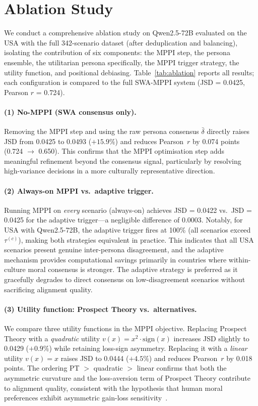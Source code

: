 \documentclass{article}
\begin{document}
\section{Ablation Study}
\label{sec:ablation}

We conduct a comprehensive ablation study on Qwen2.5-72B evaluated on the USA with
the full 342-scenario dataset (after deduplication and balancing), isolating the
contribution of six components: the MPPI step, the persona ensemble, the utilitarian
persona specifically, the MPPI trigger strategy, the utility function, and positional
debiasing. Table~\ref{tab:ablation} reports all results; each configuration is compared
to the full SWA-MPPI system (JSD = 0.0425, Pearson $r$ = 0.724).

\paragraph{(1) No-MPPI (SWA consensus only).}
Removing the MPPI step and using the raw persona consensus $\bar{\delta}$ directly
raises JSD from 0.0425 to 0.0493 ($+15.9\%$) and reduces Pearson~$r$ by 0.074 points
(0.724 $\to$ 0.650). This confirms that the MPPI optimisation step adds meaningful
refinement beyond the consensus signal, particularly by resolving high-variance decisions
in a more culturally representative direction.

\paragraph{(2) Always-on MPPI vs.\ adaptive trigger.}
Running MPPI on \emph{every} scenario (always-on) achieves JSD = 0.0422 vs.\
JSD = 0.0425 for the adaptive trigger---a negligible difference of 0.0003.
Notably, for USA with Qwen2.5-72B, the adaptive trigger fires at 100\% (all scenarios
exceed $\tau^{(c)}$), making both strategies equivalent in practice.
This indicates that all USA scenarios present genuine inter-persona disagreement,
and the adaptive mechanism provides computational savings primarily in countries
where within-culture moral consensus is stronger. The adaptive strategy is preferred
as it gracefully degrades to direct consensus on low-disagreement scenarios without
sacrificing alignment quality.

\paragraph{(3) Utility function: Prospect Theory vs.\ alternatives.}
We compare three utility functions in the MPPI objective.
Replacing Prospect Theory with a \emph{quadratic} utility $v(x) = x^2 \cdot \text{sign}(x)$
increases JSD slightly to 0.0429 ($+0.9\%$) while retaining loss-sign asymmetry.
Replacing it with a \emph{linear} utility $v(x) = x$ raises JSD to 0.0444 ($+4.5\%$)
and reduces Pearson~$r$ by 0.018 points. The ordering PT $>$ quadratic $>$ linear
confirms that both the asymmetric curvature and the loss-aversion term of Prospect
Theory contribute to alignment quality, consistent with the hypothesis that human
moral preferences exhibit asymmetric gain-loss sensitivity~\citep{kleiman2017learning}.
\end{document}
